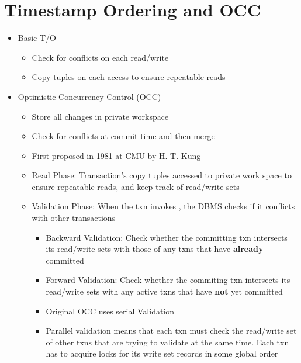 \documentclass[11pt]{article}
\begin{document}
\section{Timestamp Ordering and OCC}
\begin{itemize}
    \item Basic T/O
    \begin{itemize}
        \item Check for conflicts on each read/write
        \item Copy tuples on each access to ensure repeatable reads
    \end{itemize}
    \item Optimistic Concurrency Control (OCC)
    \begin{itemize}
        \item Store all changes in private workspace
        \item Check for conflicts at commit time and then merge
        \item First proposed in 1981 at CMU by H. T. Kung ~\cite{p213-kung}
        \item Read Phase: Transaction's copy tuples accessed to private work space to ensure repeatable reads, and keep track of read/write sets
        \item Validation Phase: When the txn invokes , the DBMS checks if it conflicts with other transactions
        \begin{itemize}
            \item Backward Validation: Check whether the committing txn intersects its read/write sets with those of any txns that have \textbf{already} committed
            \item Forward Validation: Check whether the commiting txn intersects its read/write sets with any active txns that have \textbf{not} yet committed
            \item Original OCC uses serial Validation
            \item Parallel validation means that each txn must check the read/write set of other txns that are trying to validate at the same time. Each txn has to acquire locks for its write set records in some global order


\end{itemize}
\end{itemize}
\end{itemize}
\end{document}
